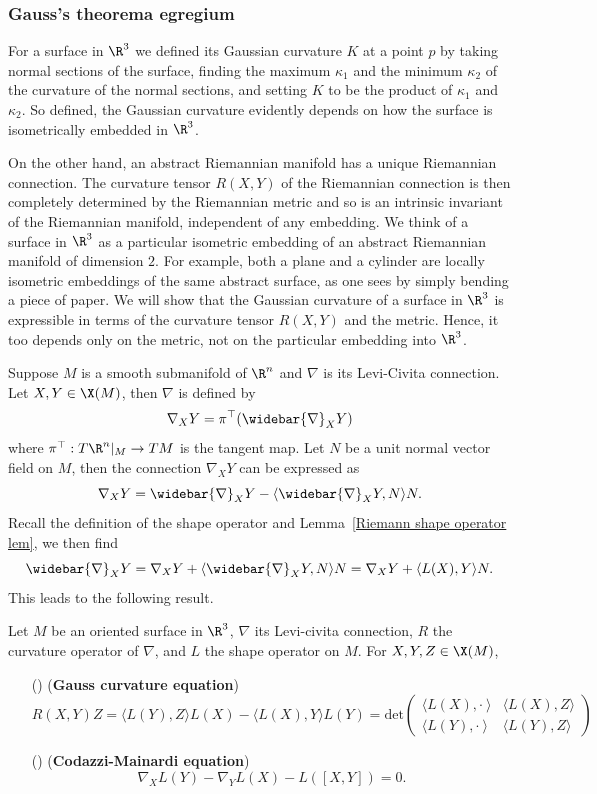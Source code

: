 \subsubsection{Gauss's theorema egregium}
For a surface in $\R^3$ we defined its Gaussian curvature $K$ at a point $p$ by taking normal sections of the surface, finding the maximum $\kappa_1$ and the minimum 
$\kappa_2$ of the curvature of the normal sections, and setting $K$ to be the product of $\kappa_1$ and $\kappa_2$. So defined, the Gaussian curvature evidently 
depends on how the surface is isometrically embedded in $\R^3$.\par
On the other hand, an abstract Riemannian manifold has a unique Riemannian connection. The curvature tensor $R(X,Y)$ of the Riemannian connection is then completely 
determined by the Riemannian metric and so is an intrinsic invariant of the Riemannian manifold, independent of any embedding. We think of a surface in $\R^3$ as a 
particular isometric embedding of an abstract Riemannian manifold of dimension $2$. For example, both a plane and a cylinder are locally isometric embeddings of the 
same abstract surface, as one sees by simply bending a piece of paper. We will show that the Gaussian curvature of a surface in $\R^3$ is expressible in terms of the 
curvature tensor $R(X,Y)$ and the metric. Hence, it too depends only on the metric, not on the particular embedding into $\R^3$.\par
Suppose $M$ is a smooth submanifold of $\R^n$ and $\nabla$ is its Levi-Civita connection. Let $X,Y\in\X(M)$, then $\nabla$ is defined by
\[\nabla_XY=\pi^{\top}(\widebar{\nabla}_XY)\]
where $\pi^{\top}:T\R^n|_M\to TM$ is the tangent map. Let $N$ be a unit normal vector field on $M$, then the connection $\nabla_XY$ can be expressed as 
\[\nabla_XY=\widebar{\nabla}_XY-\langle\widebar{\nabla}_XY,N\rangle N.\]
Recall the definition of the shape operator and Lemma~\ref{Riemann shape operator lem}, we then find
\[\widebar{\nabla}_XY=\nabla_XY+\langle\widebar{\nabla}_XY,N\rangle N=\nabla_XY+\langle L(X),Y\rangle N.\]
This leads to the following result.
\begin{theorem}
Let $M$ be an oriented surface in $\R^3$, $\nabla$ its Levi-civita connection, $R$ the curvature operator of $\nabla$, and $L$ the shape operator on $M$. For 
$X,Y,Z\in\X(M)$,
\begin{itemize}
\item[(\rmnum{1})] (\textbf{Gauss curvature equation})
\[R(X,Y)Z=\langle L(Y),Z\rangle L(X)-\langle L(X),Y\rangle L(Y)=
\mathrm{det}\begin{pmatrix}
\langle L(X),\cdot\ \rangle&\langle L(X),Z\rangle\\
\langle L(Y),\cdot\ \rangle&\langle L(Y),Z\rangle
\end{pmatrix}\] 
\item[(\rmnum{2})] (\textbf{Codazzi-Mainardi equation})
\[\nabla_XL(Y)-\nabla_YL(X)-L([X,Y])=0.\] 
\end{itemize}
\end{theorem}
